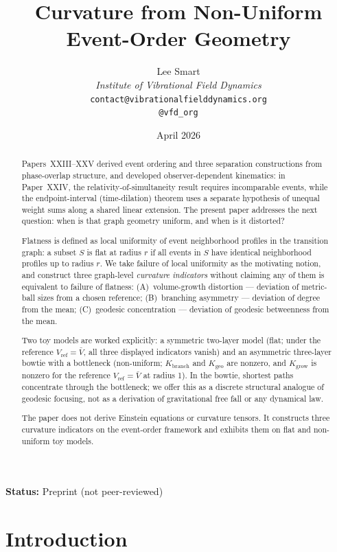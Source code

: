 \documentclass[12pt]{article}
\title{Curvature from Non-Uniform Event-Order Geometry}
\author{%
  Lee Smart\\[4pt]
  \textit{Institute of Vibrational Field Dynamics}\\[2pt]
  \texttt{contact@vibrationalfielddynamics.org}\\[2pt]
  \texttt{@vfd\_org}%
}
\date{April 2026}
\begin{document}
\maketitle

\noindent\textbf{Status:} Preprint (not peer-reviewed)

\begin{abstract}
Papers~XXIII--XXV derived event ordering and three separation constructions from phase-overlap structure, and developed observer-dependent kinematics: in Paper~XXIV, the relativity-of-simultaneity result requires incomparable events, while the endpoint-interval (time-dilation) theorem uses a separate hypothesis of unequal weight sums along a shared linear extension. The present paper addresses the next question: when is that graph geometry uniform, and when is it distorted?

Flatness is defined as local uniformity of event neighborhood profiles in the transition graph: a subset $S$ is flat at radius $r$ if all events in $S$ have identical neighborhood profiles up to radius $r$. We take failure of local uniformity as the motivating notion, and construct three graph-level \emph{curvature indicators} without claiming any of them is equivalent to failure of flatness: (A)~volume-growth distortion --- deviation of metric-ball sizes from a chosen reference; (B)~branching asymmetry --- deviation of degree from the mean; (C)~geodesic concentration --- deviation of geodesic betweenness from the mean.

Two toy models are worked explicitly: a symmetric two-layer model (flat; under the reference $V_{\mathrm{ref}} = \bar V$, all three displayed indicators vanish) and an asymmetric three-layer bowtie with a bottleneck (non-uniform; $K_{\mathrm{branch}}$ and $K_{\mathrm{geo}}$ are nonzero, and $K_{\mathrm{grow}}$ is nonzero for the reference $V_{\mathrm{ref}} = \bar V$ at radius 1). In the bowtie, shortest paths concentrate through the bottleneck; we offer this as a discrete structural analogue of geodesic focusing, not as a derivation of gravitational free fall or any dynamical law.

The paper does not derive Einstein equations or curvature tensors. It constructs three curvature indicators on the event-order framework and exhibits them on flat and non-uniform toy models.
\end{abstract}

\section{Introduction}\label{sec:intro}
\end{document}
